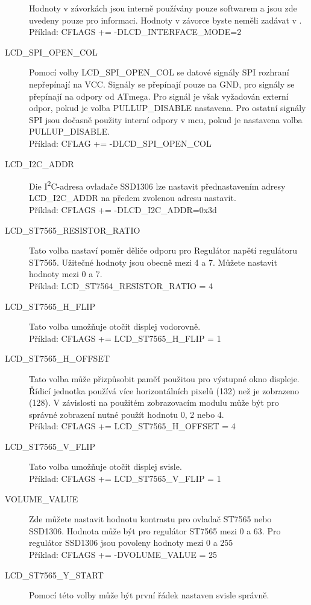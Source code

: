 \begin{description}
Hodnoty v závorkách jsou interně používány pouze softwarem a jsou zde uvedeny pouze pro informaci.
Hodnoty v závorce byste neměli zadávat v .\\
Příklad: CFLAGS += -DLCD\_INTERFACE\_MODE=2
\item[LCD\_SPI\_OPEN\_COL] Pomocí volby LCD\_SPI\_OPEN\_COL se datové signály SPI rozhraní nepřepínají na VCC.
	Signály se přepínají pouze na GND, pro  signály se přepínají na  odpory od ATmega.
Pro  signál je však vyžadován externí odpor, pokud je volba PULLUP\_DISABLE nastavena.
Pro ostatní signály SPI jsou dočasně použity interní  odpory v mcu,
pokud je nastavena volba PULLUP\_DISABLE.\\
Příklad: CFLAG += -DLCD\_SPI\_OPEN\_COL
\item[LCD\_I2C\_ADDR] Die I\textsuperscript{2}C-adresa ovladače SSD1306 lze nastavit přednastavením adresy
LCD\_I2C\_ADDR na předem zvolenou adresu nastavit.\\
Příklad: CFLAGS += -DLCD\_I2C\_ADDR=0x3d
\item[LCD\_ST7565\_RESISTOR\_RATIO] Tato volba nastaví poměr děliče odporu pro
Regulátor napětí regulátoru ST7565. Užitečné hodnoty jsou obecně mezi 4 a 7.
Můžete nastavit hodnoty mezi 0 a 7. \\
Příklad: LCD\_ST7564\_RESISTOR\_RATIO = 4
\item[LCD\_ST7565\_H\_FLIP] Tato volba umožňuje otočit displej vodorovně.\\
Příklad: CFLAGS += LCD\_ST7565\_H\_FLIP = 1
\item[LCD\_ST7565\_H\_OFFSET] Tato volba může přizpůsobit paměť použitou pro výstupné okno displeje.
Řídicí jednotka používá více horizontálních pixelů (132) než je zobrazeno (128).
V závislosti na použitém zobrazovacím modulu může být pro správné zobrazení nutné použít hodnotu 0, 2 nebo 4.\\
Příklad: CFLAGS += LCD\_ST7565\_H\_OFFSET = 4
\item[LCD\_ST7565\_V\_FLIP] Tato volba umožňuje otočit displej svisle.\\
Příklad: CFLAGS += LCD\_ST7565\_V\_FLIP = 1
\item[VOLUME\_VALUE] Zde můžete nastavit hodnotu kontrastu pro ovladač ST7565 nebo SSD1306.
Hodnota může být pro regulátor ST7565 mezi 0 a 63.
Pro regulátor SSD1306 jsou povoleny hodnoty mezi 0 a 255 \\
Příklad: CFLAGS += -DVOLUME\_VALUE = 25
\item[LCD\_ST7565\_Y\_START] Pomocí této volby může být první řádek nastaven svisle správně.

\end{description}

